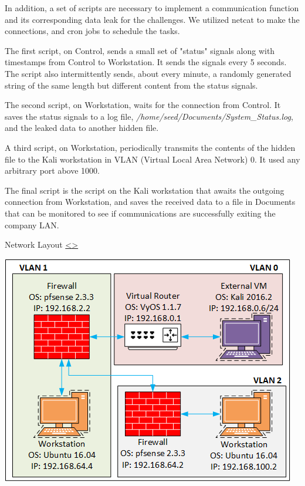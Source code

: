 \documentclass[12pt]{extarticle}
\newenvironment{instructionblock}{\Large\bgroup}{\egroup}
\begin{document}
In addition, a set of scripts are necessary to implement a communication function and its corresponding data leak for the challenges. We utilized netcat to make the connections, and cron jobs to schedule the tasks. 

The first script, on Control, sends a small set of "status" signals along with timestamps from Control to Workstation. It sends the signals every 5 seconds. The script also intermittently sends, about every minute, a randomly generated string of the same length but different content from the status signals. 

The second script, on Workstation, waits for the connection from Control. It saves the status signals to a log file, \textit{/home/seed/Documents/System\_Status.log}, and the leaked data to another hidden file.

A third script, on Workstation, periodically transmits the contents of the hidden file to the Kali workstation in VLAN (Virtual Local Area Network) 0. It used any arbitrary port above 1000.

The final script is the script on the Kali workstation that awaits the outgoing connection from Workstation, and saves the received data to a file in Documents that can be monitored to see if communications are successfully exiting the company LAN.







\pagebreak
\begin{slide}{ Network Layout }{ \hyperref[slide 3]{\textless}\hyperref[slide 5]{\textgreater} }
\vskip 5pt
	\begin{instructionblock}
		\begin{center}
			\includegraphics{NetworkDiagram.png}
		\end{center}

	\end{instructionblock}
\end{slide}
\end{document}
